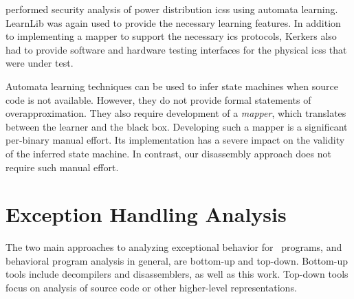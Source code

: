 \Textcite{kerkers2017assessing} performed security analysis
of power distribution \acp{ics} using automata learning.
LearnLib was again used to provide the necessary learning features.
In addition to implementing a mapper to support the necessary \ac{ics}
protocols, Kerkers also had to provide software and hardware testing interfaces for the physical \acp{ics} that were under test.

Automata learning techniques can be used to infer state machines when source code is not available.
However, they do not provide formal statements of overapproximation.
They also require development of a \emph{mapper}, which translates between the learner and the black box.
Developing such a mapper is a significant per-binary manual effort.
Its implementation has a severe impact on the validity of the inferred state machine.
In contrast, our disassembly approach does not require such manual effort.

\section{Exception Handling Analysis}\label{related-exceptions}
The two main approaches to analyzing exceptional behavior for \Cpp\ programs, and behavioral program analysis in general, are bottom-up and top-down.
Bottom-up tools include decompilers and disassemblers, as well as this work.
Top-down tools focus on analysis of source code or other higher-level representations.

